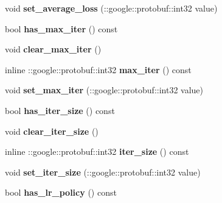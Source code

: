 \begin{DoxyCompactItemize}
void {\bfseries set\+\_\+average\+\_\+loss} (\+::google\+::protobuf\+::int32 value)
\item 
\mbox{\label{classcaffe_1_1_solver_parameter_a2695eeeb06cb1f9904c45465fbf5e5af}} 
bool {\bfseries has\+\_\+max\+\_\+iter} () const
\item 
\mbox{\label{classcaffe_1_1_solver_parameter_a784f1876417151deeeb831e89725ec49}} 
void {\bfseries clear\+\_\+max\+\_\+iter} ()
\item 
\mbox{\label{classcaffe_1_1_solver_parameter_a60136b77174c3808c01bbf012f3cec9e}} 
inline \+::google\+::protobuf\+::int32 {\bfseries max\+\_\+iter} () const
\item 
\mbox{\label{classcaffe_1_1_solver_parameter_ac6b2d3ebe8bc4d7a751c8175fb51df66}} 
void {\bfseries set\+\_\+max\+\_\+iter} (\+::google\+::protobuf\+::int32 value)
\item 
\mbox{\label{classcaffe_1_1_solver_parameter_ac2bdd53240d708d4c8374db3d58e3cd7}} 
bool {\bfseries has\+\_\+iter\+\_\+size} () const
\item 
\mbox{\label{classcaffe_1_1_solver_parameter_a1fb001bda682ee81a56d45f73cd3b15a}} 
void {\bfseries clear\+\_\+iter\+\_\+size} ()
\item 
\mbox{\label{classcaffe_1_1_solver_parameter_a6e142c4db6ca15c06db8ec970117cbc7}} 
inline \+::google\+::protobuf\+::int32 {\bfseries iter\+\_\+size} () const
\item 
\mbox{\label{classcaffe_1_1_solver_parameter_ac1a503fe695f61bac4efb0621263280b}} 
void {\bfseries set\+\_\+iter\+\_\+size} (\+::google\+::protobuf\+::int32 value)
\item 
\mbox{\label{classcaffe_1_1_solver_parameter_af4f4bbe39491efefdb450503a8ea0700}} 
bool {\bfseries has\+\_\+lr\+\_\+policy} () const
\item 
\mbox{\label{classcaffe_1_1_solver_parameter_aeb821a6aa186f2593778aaac41d3b5ea}} 

\end{DoxyCompactItemize}

